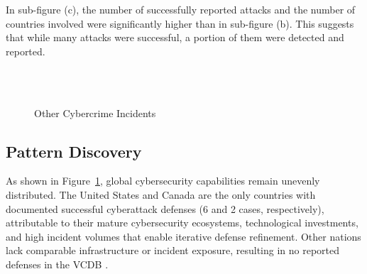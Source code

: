 	In sub-figure (c), the number of successfully reported attacks and the number of countries involved were significantly higher than in sub-figure (b).
	This suggests that while many attacks were successful, a portion of them were detected and reported.
	\begin{figure}[htb]
		\centering
		\\
		\hfill
		\\
		\caption{Other Cybercrime Incidents}\label{fig:other-cybercrime-incidents}
	\end{figure}
\subsection{Pattern Discovery}\label{subsec:pattern-discovery} %
	As shown in Figure~\ref{fig:other-cybercrime-incidents}, global cybersecurity capabilities remain unevenly distributed.
	The United States and Canada are the only countries with documented successful cyberattack defenses (6 and 2 cases, respectively),
	attributable to their mature cybersecurity ecosystems, technological investments, and high incident volumes that enable iterative defense refinement.
	Other nations lack comparable infrastructure or incident exposure, resulting in no reported defenses in the VCDB .


